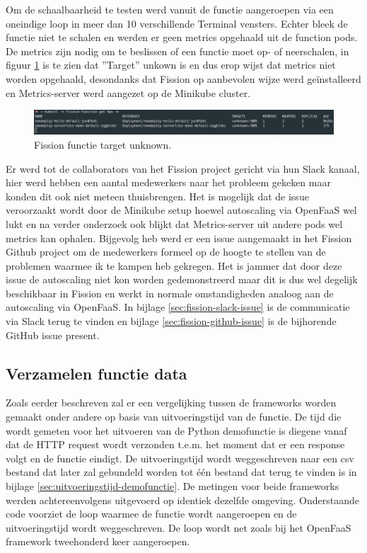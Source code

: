 Om de schaalbaarheid te testen werd vanuit de functie  aangeroepen via een oneindige loop in meer dan 10 verschillende Terminal vensters. Echter bleek de functie niet te schalen en werden er geen metrics opgehaald uit de function pods. De metrics zijn nodig om te beslissen of een functie moet op- of neerschalen, in figuur \ref{fig:fission-scalability-issue} is te zien dat ''Target'' unkown is en dus erop wijst dat metrics niet worden opgehaald, desondanks dat Fission op aanbevolen wijze werd geïnstalleerd en Metrics-server werd aangezet op de Minikube cluster.
\begin{figure}
    \includegraphics[width=1\textwidth]{img/fission-scalability-issue.png}
    \caption{Fission functie target unknown.}
    \label{fig:fission-scalability-issue}  
\end{figure}

Er werd tot de collaborators van het Fission project gericht via hun Slack kanaal, hier werd hebben een aantal medewerkers naar het probleem gekeken maar konden dit ook niet meteen thuisbrengen. Het is mogelijk dat de issue veroorzaakt wordt door de Minikube setup hoewel autoscaling via OpenFaaS wel lukt en na verder onderzoek ook blijkt dat Metrics-server uit andere pods wel metrics kan ophalen. Bijgevolg heb werd er een issue aangemaakt in het Fission Github project om de medewerkers formeel op de hoogte te stellen van de problemen waarmee ik te kampen heb gekregen. Het is jammer dat door deze issue de autoscaling niet kon worden gedemonstreerd maar dit is dus wel degelijk beschikbaar in Fission en werkt in normale omstandigheden analoog aan de autoscaling via OpenFaaS. In bijlage \ref{sec:fission-slack-issue} is de communicatie via Slack terug te vinden en bijlage \ref{sec:fission-github-issue} is de bijhorende GitHub issue present.

\subsection{Verzamelen functie data}
Zoals eerder beschreven zal er een vergelijking tussen de frameworks worden gemaakt onder andere op basis van uitvoeringstijd van de functie. De tijd die wordt gemeten voor het uitvoeren van de Python demofunctie is diegene vanaf dat de HTTP request wordt verzonden t.e.m. het moment dat er een response volgt en de functie eindigt. De uitvoeringstijd wordt weggeschreven naar een csv bestand dat later zal gebundeld worden tot één bestand dat terug te vinden is in bijlage \ref{sec:uitvoeringstijd-demofunctie}. De metingen voor beide frameworks werden achtereenvolgens uitgevoerd op identiek dezelfde omgeving. Onderstaande code voorziet de loop waarmee de functie wordt aangeroepen en de uitvoeringstijd wordt weggeschreven. De loop wordt net zoals bij het OpenFaaS framework tweehonderd keer aangeroepen.

